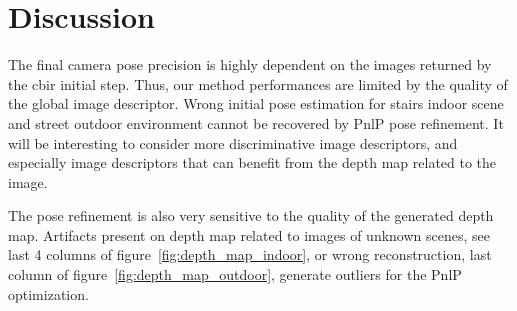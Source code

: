 \section{Discussion}
The final camera pose precision is highly dependent on the images returned by the \ac{cbir} initial step. Thus, our method performances are limited by the quality of the global image descriptor. Wrong initial pose estimation for stairs indoor scene and street outdoor environment cannot be recovered by PnlP pose refinement. It will be interesting to consider more discriminative image descriptors, and especially image descriptors that can benefit from the depth map related to the image.

The pose refinement is also very sensitive to the quality of the generated depth map. Artifacts present on depth map related to images of unknown scenes, see last 4 columns of figure~\ref{fig:depth_map_indoor}, or wrong reconstruction, last column of figure~\ref{fig:depth_map_outdoor}, generate outliers for the PnlP optimization. 

